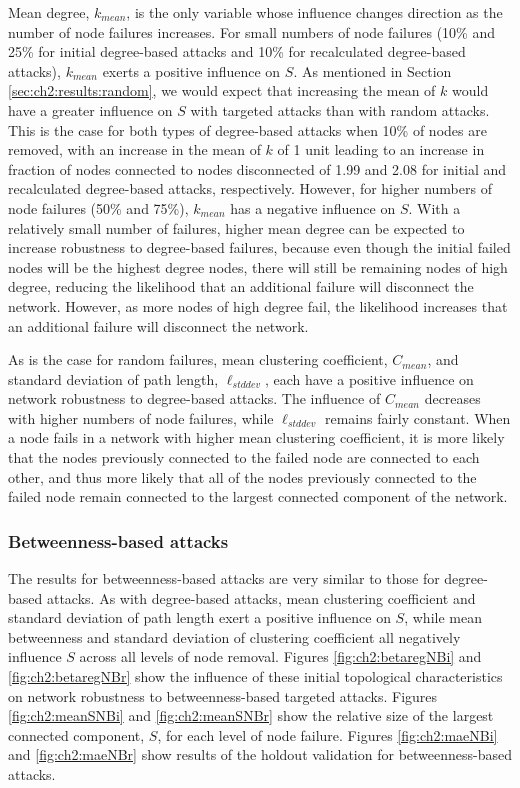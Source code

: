 Mean degree, $k_{mean}$, is the only variable whose influence changes direction as the number of node failures increases.  For small numbers of node failures (10\% and 25\% for initial degree-based attacks and 10\% for recalculated degree-based attacks), $k_{mean}$ exerts a positive influence on $S$.  As mentioned in Section \ref{sec:ch2:results:random}, we would expect that increasing the mean of $k$ would have a greater influence on $S$ with targeted attacks than with random attacks.  This is the case for both types of degree-based attacks when 10\% of nodes are removed, with an increase in the mean of $k$ of 1 unit leading to an increase in fraction of nodes connected to nodes disconnected of 1.99 and 2.08 for initial and recalculated degree-based attacks, respectively. However, for higher numbers of node failures (50\% and 75\%), $k_{mean}$ has a negative influence on $S$. With a relatively small number of failures, higher mean degree can be expected to increase robustness to degree-based failures, because even though the initial failed nodes will be the highest degree nodes, there will still be remaining nodes of high degree, reducing the likelihood that an additional failure will disconnect the network. However, as more nodes of high degree fail, the likelihood increases that an additional failure will disconnect the network.

As is the case for random failures, mean clustering coefficient, $C_{mean}$, and standard deviation of path length, $\ell_{std dev}$, each have a positive influence on network robustness to degree-based attacks. The influence of $C_{mean}$ decreases with higher numbers of node failures, while $\ell_{std dev}$ remains fairly constant. When a node fails in a network with higher mean clustering coefficient, it is more likely that the nodes previously connected to the failed node are connected to each other, and thus more likely that all of the nodes previously connected to the failed node remain connected to the largest connected component of the network.

\subsubsection{Betweenness-based attacks}
\label{sec:ch2:results:targeted:betweenness}

The results for betweenness-based attacks are very similar to those for degree-based attacks. As with degree-based attacks, mean clustering coefficient and standard deviation of path length exert a positive influence on $S$, while mean betweenness and standard deviation of clustering coefficient all negatively influence $S$ across all levels of node removal.  Figures \ref{fig:ch2:betaregNBi} and \ref{fig:ch2:betaregNBr} show the influence of these initial topological characteristics on network robustness to betweenness-based targeted attacks.  Figures \ref{fig:ch2:meanSNBi} and \ref{fig:ch2:meanSNBr} show the relative size of the largest connected component, $S$, for each level of node failure.  Figures \ref{fig:ch2:maeNBi} and \ref{fig:ch2:maeNBr} show results of the holdout validation for betweenness-based attacks.


